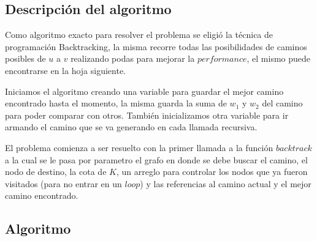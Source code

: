 \subsection{Descripci\'on del algoritmo}

Como algoritmo exacto para resolver el problema se eligi\'o la t\'ecnica de programaci\'on Backtracking, la misma recorre todas las posibilidades de caminos posibles de $u$ a $v$ realizando podas para mejorar la $performance$, el mismo puede encontrarse en la hoja siguiente.

Iniciamos el algoritmo creando una variable para guardar el mejor camino encontrado hasta el momento, la misma guarda la suma de $w_{1}$ y $w_{2}$ del camino para poder comparar con otros. Tambi\'en inicializamos otra variable para ir armando el camino que se va generando en cada llamada recursiva.

El problema comienza a ser resuelto con la primer llamada a la funci\'on $backtrack$ a la cual se le pasa por parametro el grafo en donde se debe buscar el camino, el nodo de destino, la cota de $K$, un arreglo para controlar los nodos que ya fueron visitados (para no entrar en un $loop$) y las referencias al camino actual y el mejor camino encontrado.


\newpage
\subsection{Algoritmo}

